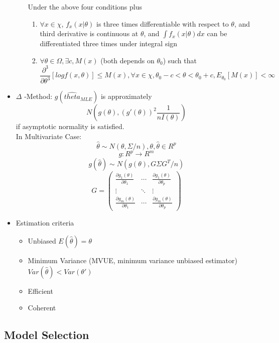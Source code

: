 \documentclass[11pt, openany]{book}              %
\begin{document}
\begin{itemize}
\begin{enumerate}
    		Under the above four conditions plus 
    		\begin{enumerate}
    			\item $ \forall x \in \chi$, $f_x(x|\theta)$ is three times differentiable with respect to $\theta$, and third derivative is continuous at $\theta$, and $\int f_x(x|\theta) dx$ can be differentiated three times under integral sign
    			\item $ \forall \theta \in \Omega, \exists c, M(x)$ (both depends on $\theta_0$) such that
    			$$ \frac{\partial^3}{\partial \theta^3} [log f(x, \theta ) ] \leq M(x), \forall x \in \chi, \theta_0-c<\theta < \theta_0+c, E_{\theta_0} [M(x)] < \infty$$
    		\end{enumerate}
    	\end{enumerate}
    \item $\Delta$ -Method: $g(\hat{theta}_{MLE})$ is approximately
    	  $$ N(g(\theta), (g'(\theta))^2 \frac{1}{nI(\theta)})$$ if asymptotic normality is satisfied. \\
    	  In Multivariate Case:
    	  $$ \hat{\theta} \sim N(\theta, \Sigma/n), \theta,\hat{\theta} \in R^p $$
    	  $$g: R^p \rightarrow R^m$$
    	  $$g(\hat{\theta}) \sim N(g(\theta), G\Sigma G^T/n)$$
		  $$ G = \begin{pmatrix} 
  				\frac{\partial{g_1(\theta)}}{\partial{\theta_1}}& \cdots & \frac{\partial{g_1(\theta)}}{\partial{\theta_p}}\\ 
  				\vdots & \ddots & \vdots \\
  				\frac{\partial{g_m(\theta)}}{\partial{\theta_1}}& \cdots & \frac{\partial{g_m(\theta)}}{\partial{\theta_p}} 
			\end{pmatrix} $$
    \item Estimation criteria
   		\begin{itemize}
   		 \item Unbiased $E(\hat{\theta}) = \theta$
   		 \item Minimum Variance (MVUE, minimum variance unbiased estimator) $Var(\hat{\theta}) < Var(\theta')$
   		 \item Efficient
   		 \item Coherent
   		 \end{itemize}
\end{itemize}

\subsection{Model Selection}
\end{document}
